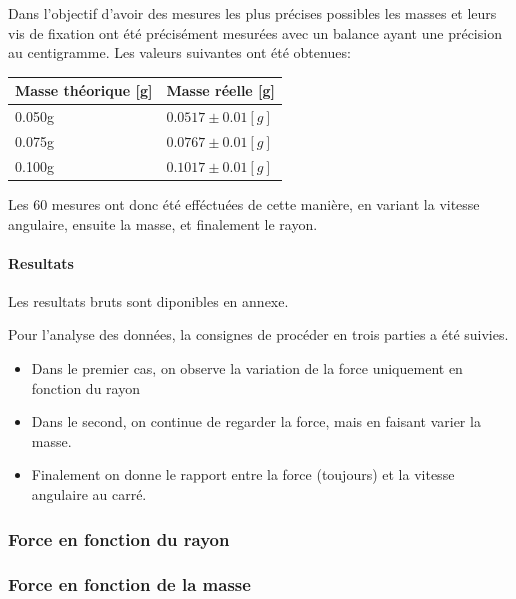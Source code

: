 Dans l'objectif d'avoir des mesures les plus précises possibles les masses et leurs vis de fixation ont été précisément mesurées avec un balance ayant une précision au centigramme. Les valeurs suivantes ont été obtenues:
\begin{table}[ht]
    \centering
    \begin{tabular}{|l|l|}
	\hline
	Masse théorique [g] & Masse réelle [g]\\
	\hline
	0.050g & $0.0517 \pm 0.01 [g]$\\
	0.075g & $0.0767 \pm 0.01 [g]$\\
	0.100g & $0.1017 \pm 0.01 [g]$\\
	\hline
    \end{tabular}
\end{table}

Les 60 mesures ont donc été efféctuées de cette manière, en variant la vitesse angulaire, ensuite la masse, et finalement le rayon. 

\paragraph{Resultats}
Les resultats bruts sont diponibles en annexe.

Pour l'analyse des données, la consignes de procéder en trois parties a été suivies.
\begin{itemize}
    \item Dans le premier cas, on observe la variation de la force uniquement en fonction du rayon
    \item Dans le second, on continue de regarder la force, mais en faisant varier la masse.
    \item Finalement on donne le rapport entre la force (toujours) et la vitesse angulaire au carré.
\end{itemize}

\subsubsection{Force en fonction du rayon}

\subsubsection{Force en fonction de la masse}

